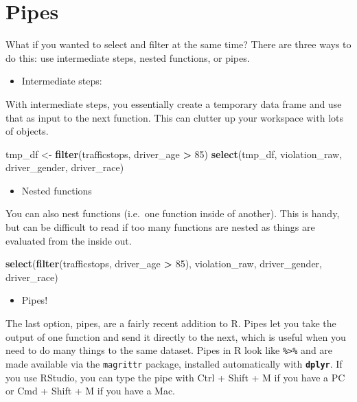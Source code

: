 \documentclass[]{book}
\newenvironment{Shaded}{\begin{snugshade}}{\end{snugshade}}
\newcommand{\KeywordTok}[1]{\textcolor[rgb]{0.13,0.29,0.53}{\textbf{#1}}}
\newcommand{\DecValTok}[1]{\textcolor[rgb]{0.00,0.00,0.81}{#1}}
\newcommand{\StringTok}[1]{\textcolor[rgb]{0.31,0.60,0.02}{#1}}
\newcommand{\OperatorTok}[1]{\textcolor[rgb]{0.81,0.36,0.00}{\textbf{#1}}}
\newcommand{\NormalTok}[1]{#1}
\providecommand{\tightlist}{%
  \setlength{\itemsep}{0pt}\setlength{\parskip}{0pt}}
\theoremstyle{definition}
\theoremstyle{definition}
\theoremstyle{definition}
\theoremstyle{remark}
\begin{document}
\section{Pipes}\label{pipes}

What if you wanted to select and filter at the same time? There are
three ways to do this: use intermediate steps, nested functions, or
pipes.

\begin{itemize}
\tightlist
\item
  Intermediate steps:
\end{itemize}

With intermediate steps, you essentially create a temporary data frame
and use that as input to the next function. This can clutter up your
workspace with lots of objects.

\begin{Shaded}
\begin{Highlighting}[]
\NormalTok{tmp_df <-}\StringTok{ }\KeywordTok{filter}\NormalTok{(trafficstops, driver_age }\OperatorTok{>}\StringTok{ }\DecValTok{85}\NormalTok{)}
\KeywordTok{select}\NormalTok{(tmp_df, violation_raw, driver_gender, driver_race)}
\end{Highlighting}
\end{Shaded}

\begin{itemize}
\tightlist
\item
  Nested functions
\end{itemize}

You can also nest functions (i.e.~one function inside of another). This
is handy, but can be difficult to read if too many functions are nested
as things are evaluated from the inside out.

\begin{Shaded}
\begin{Highlighting}[]
\KeywordTok{select}\NormalTok{(}\KeywordTok{filter}\NormalTok{(trafficstops, driver_age }\OperatorTok{>}\StringTok{ }\DecValTok{85}\NormalTok{), violation_raw, driver_gender, driver_race)}
\end{Highlighting}
\end{Shaded}

\begin{itemize}
\tightlist
\item
  Pipes!
\end{itemize}

The last option, pipes, are a fairly recent addition to R. Pipes let you
take the output of one function and send it directly to the next, which
is useful when you need to do many things to the same dataset. Pipes in
R look like \texttt{\%\textgreater{}\%} and are made available via the
\texttt{magrittr} package, installed automatically with
\textbf{\texttt{dplyr}}. If you use RStudio, you can type the pipe with
Ctrl + Shift + M if you have a PC or Cmd + Shift + M if you have a Mac.
\end{document}
